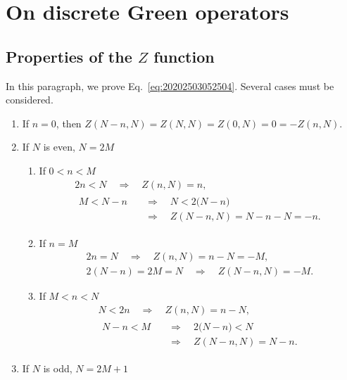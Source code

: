 \documentclass[draft, appendixprefix=true, chapterprefix=true, fontsize=12pt, numbers=noendperiod]{scrbook}
\begin{document}
\appendix

\chapter{On discrete Green operators}
\label{cha:20202603052606}

\section{Properties of the \(Z\) function}
\label{sec:20202503052552}

In this paragraph, we prove Eq.~\eqref{eq:20202503052504}. Several cases must
be considered.

\begin{enumerate}
  \setlength{\itemsep}{0pt}
\item If \(n=0\), then \(Z(N-n, N)=Z(N, N)=Z(0, N)=0=-Z(n, N)\).
\item If \(N\) is even, \(N=2M\)
  \begin{enumerate}
    \setlength{\itemsep}{0pt}
  \item If \(0<n<M\)
    \begin{gather*}
      2n<N\quad\Rightarrow\quad Z(n, N)=n,\\
      \begin{aligned}
        M<N-n&\quad\Rightarrow\quad N<2\bigl(N-n\bigr)\\
        &\quad\Rightarrow\quad Z(N-n, N)=N-n-N=-n.
      \end{aligned}
    \end{gather*}
  \item If \(n=M\)
    \begin{gather*}
      2n=N\quad\Rightarrow\quad Z(n, N)=n-N=-M,\\
      2(N-n)=2M=N\quad\Rightarrow\quad Z(N-n, N)=-M.
    \end{gather*}
  \item If \(M<n<N\)
    \begin{gather*}
      N<2n\quad\Rightarrow\quad Z(n, N)=n-N,\\
      \begin{aligned}
        N-n<M&\quad\Rightarrow\quad 2\bigl(N-n\bigr)<N\\
        &\quad\Rightarrow\quad Z(N-n, N)=N-n.
   \end{aligned}
    \end{gather*}
  \end{enumerate}
\item If \(N\) is odd, \(N=2M+1\)
  \begin{enumerate}

\end{enumerate}
\end{enumerate}
\end{document}
